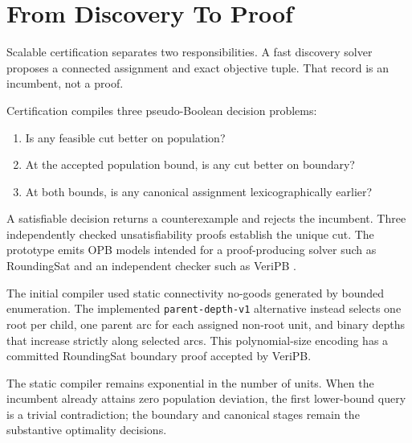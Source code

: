 \section{From Discovery To Proof}

Scalable certification separates two responsibilities. A fast discovery
solver proposes a connected assignment and exact objective tuple. That record
is an incumbent, not a proof.

Certification compiles three pseudo-Boolean decision problems:
\begin{enumerate}
  \item Is any feasible cut better on population?
  \item At the accepted population bound, is any cut better on boundary?
  \item At both bounds, is any canonical assignment lexicographically earlier?
\end{enumerate}

A satisfiable decision returns a counterexample and rejects the incumbent.
Three independently checked unsatisfiability proofs establish the unique cut.
The prototype emits OPB models intended for a proof-producing solver such as
RoundingSat and an independent checker such as VeriPB
\cite{veripb2020,roundingsat2018}.

The initial compiler used static connectivity no-goods generated by bounded
enumeration. The implemented \texttt{parent-depth-v1} alternative instead
selects one root per child, one parent arc for each assigned non-root unit, and
binary depths that increase strictly along selected arcs. This polynomial-size
encoding has a committed RoundingSat boundary proof accepted by VeriPB.

The static compiler remains exponential in the number of units. When the incumbent
already attains zero population deviation, the first lower-bound query is a
trivial contradiction; the boundary and canonical stages remain the
substantive optimality decisions.
